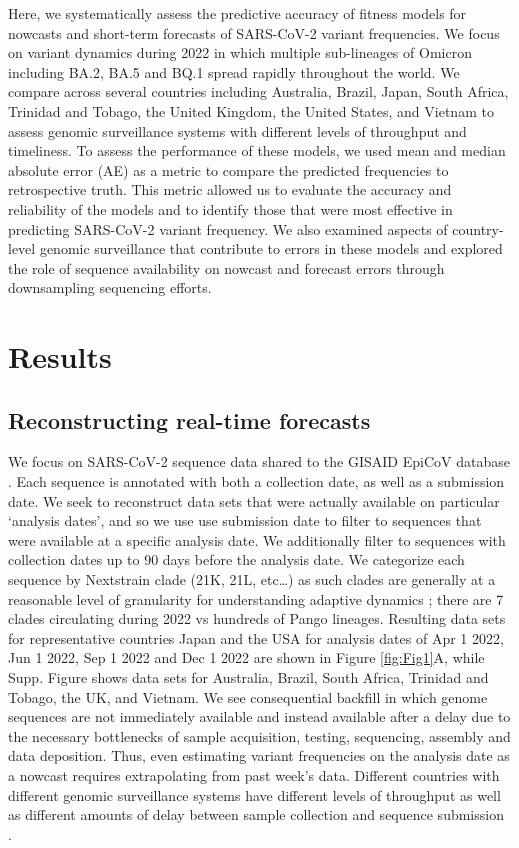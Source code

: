 \documentclass[10pt,letterpaper]{article}
\begin{document}
Here, we systematically assess the predictive accuracy of fitness models for nowcasts and short-term forecasts of SARS-CoV-2 variant frequencies.
We focus on variant dynamics during 2022 in which multiple sub-lineages of Omicron including BA.2, BA.5 and BQ.1 spread rapidly throughout the world.
We compare across several countries including Australia, Brazil, Japan, South Africa, Trinidad and Tobago, the United Kingdom, the United States, and Vietnam to assess genomic surveillance systems with different levels of throughput and timeliness.
To assess the performance of these models, we used mean and median absolute error (AE) as a metric to compare the predicted frequencies to retrospective truth.
This metric allowed us to evaluate the accuracy and reliability of the models and to identify those that were most effective in predicting SARS-CoV-2 variant frequency.
We also examined aspects of country-level genomic surveillance that contribute to errors in these models and explored the role of sequence availability on nowcast and forecast errors through downsampling sequencing efforts.

\section*{Results}

\subsection*{Reconstructing real-time forecasts}

We focus on SARS-CoV-2 sequence data shared to the GISAID EpiCoV database \cite{shu2017gisaid}.
Each sequence is annotated with both a collection date, as well as a submission date.
We seek to reconstruct data sets that were actually available on particular `analysis dates', and so we use use submission date to filter to sequences that were available at a specific analysis date.
We additionally filter to sequences with collection dates up to 90 days before the analysis date.
We categorize each sequence by Nextstrain clade (21K, 21L, etc\dots) as such clades are generally at a reasonable level of granularity for understanding adaptive dynamics \cite{bloom2023fitness}; there are 7 clades circulating during 2022 vs hundreds of Pango lineages.
Resulting data sets for representative countries Japan and the USA for analysis dates of Apr 1 2022, Jun 1 2022, Sep 1 2022 and Dec 1 2022 are shown in Figure \ref{fig:Fig1}A, while Supp. Figure  shows data sets for Australia, Brazil, South Africa, Trinidad and Tobago, the UK, and Vietnam.
We see consequential backfill in which genome sequences are not immediately available and instead available after a delay due to the necessary bottlenecks of sample acquisition, testing, sequencing, assembly and data deposition.
Thus, even estimating variant frequencies on the analysis date as a nowcast requires extrapolating from past week's data.
Different countries with different genomic surveillance systems have different levels of throughput as well as different amounts of delay between sample collection and sequence submission \cite{brito2022global}.
\end{document}
